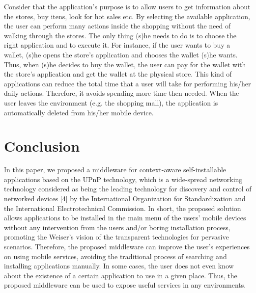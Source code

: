 \documentclass[journal]{IEEEtran}
\begin{document}
Consider that the application's purpose is to allow users to get information about the stores, buy itens, look for hot sales etc. By selecting the available application, the user can perform many actions inside the shopping without the need of walking through the stores. The only thing (s)he needs to do is to choose the right application and to execute it. For instance, if the user wants to buy a wallet, (s)he opens the store's  application and chooses the wallet (s)he wants. Thus, when (s)he decides to buy the wallet, the user can pay for the wallet with the store's application and get the wallet at the physical store. This kind of applications can reduce the total time that a user will take for performing his/her daily actions. Therefore, it avoids spending more time then needed. When the user leaves the environment (e.g. the shopping mall), the application is automatically deleted from his/her mobile device.

\section{Conclusion}
In this paper, we proposed a middleware for context-aware self-installable applications based on the UPnP technology, which is a wide-spread networking technology considered as being the leading technology for discovery and control of networked devices [4] by the International Organization for Standardization and the International Electrotechnical Commission. In short, the proposed solution allows applications to be  installed in the main menu of the users' mobile devices without any intervention from the users and/or boring installation process, promoting the Weiser's vision of the transparent technologies for pervasive scenarios. Therefore, the proposed middleware can improve the user's experiences on using mobile services, avoiding the traditional process of searching and installing applications manually. In some cases, the user does not even know about the existence of a certain application to use in a given place. Thus, the proposed middleware can be used to expose useful services in any environments.

\ifCLASSOPTIONcaptionsoff
  \newpage
\fi 

{}

\end{document}
